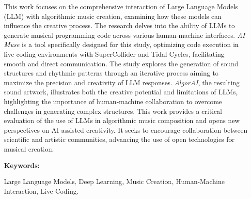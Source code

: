     This work focuses on the comprehensive interaction of Large Language Models (LLM) with algorithmic music creation, examining how these models can influence the creative process. The research delves into the ability of LLMs to generate musical programming code across various human-machine interfaces. \emph{AI Muse} is a tool specifically designed for this study, optimizing code execution in live coding environments with SuperCollider and Tidal Cycles, facilitating smooth and direct communication. The study explores the generation of sound structures and rhythmic patterns through an iterative process aiming to maximize the precision and creativity of LLM responses. \emph{AlgorAI}, the resulting sound artwork, illustrates both the creative potential and limitations of LLMs, highlighting the importance of human-machine collaboration to overcome challenges in generating complex structures. This work provides a critical evaluation of the use of LLMs in algorithmic music composition and opens new perspectives on AI-assisted creativity. It seeks to encourage collaboration between scientific and artistic communities, advancing the use of open technologies for musical creation.
  
    \vspace{1cm}
    \textbf{Keywords:} %
    
    Large Language Models, Deep Learning, Music Creation, Human-Machine Interaction, Live Coding.
  